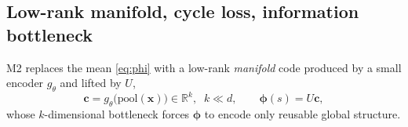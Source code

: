 \documentclass[11pt]{article}
\newcommand{\R}{\mathbb{R}}
\newcommand{\xb}{\bm{x}}
\newcommand{\phib}{\bm{\phi}}
\newcommand{\cb}{\bm{c}}
\newcommand{\impl}{}
\begin{document}
\subsection{Low-rank manifold, cycle loss, information bottleneck}
\label{sec:m2}

M2 replaces the mean \eqref{eq:phi} with a low-rank \emph{manifold} code \impl
produced by a small encoder $g_\theta$ and lifted by $U$,
\begin{equation}
  \cb = g_\theta\big(\mathrm{pool}(\xb)\big)\in\R^{k},\;\; k\ll d,
  \qquad \phib(s)=U\cb,
\end{equation}
whose $k$-dimensional bottleneck forces $\phib$ to encode only reusable global
structure.
\end{document}
